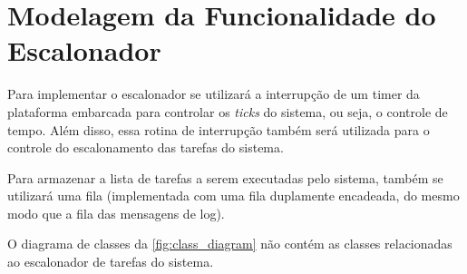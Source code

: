 %
%
%
%
%

%
%
%
%
%

\section{Modelagem da Funcionalidade do Escalonador} \label{sec:scheduler}

Para implementar o escalonador se utilizará a interrupção de um timer da plataforma embarcada para controlar os \textit{ticks} do sistema, ou seja, o controle de tempo. Além disso, essa rotina de interrupção também será utilizada para o controle do escalonamento das tarefas do sistema.

Para armazenar a lista de tarefas a serem executadas pelo sistema, também se utilizará uma fila (implementada com uma fila duplamente encadeada, do mesmo modo que a fila das mensagens de log).

O diagrama de classes da \autoref{fig:class_diagram} não contém as classes relacionadas ao escalonador de tarefas do sistema.
